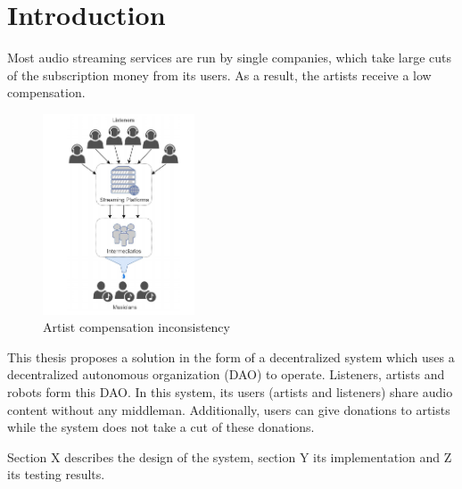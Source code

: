 
\chapter{\label{chap:introduction}Introduction}
Most audio streaming services are run by single companies, which take large cuts of the subscription money from its users. As a result, the artists receive a low compensation. 

\begin{figure}
	\includegraphics[width=0.4\textwidth]{./img/problem-image.png}
	\caption{Artist compensation inconsistency}
\end{figure}

This thesis proposes a solution in the form of a decentralized system which uses a decentralized autonomous organization (DAO) to operate. Listeners, artists and robots form this DAO. In this system, its users (artists and listeners) share audio content without any middleman. Additionally, users can give donations to artists while the system does not take a cut of these donations. 

 Section X describes the design of the system, section Y its implementation and Z its testing results.